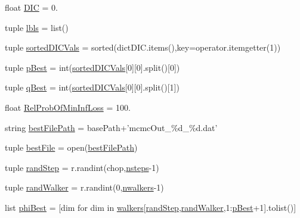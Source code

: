 \begin{DoxyCompactItemize}
\item 
float \hyperlink{namespace_final_analysis_a68c248ca9c873f73a8e36a8ee251cb55}{D\-I\-C} = 0.
\item 
tuple \hyperlink{namespace_final_analysis_ad0acefcc028d6b5ed6a5df8a33837c93}{lbls} = list()
\item 
tuple \hyperlink{namespace_final_analysis_ac46e153da6c229304def2ef1594ad6d0}{sorted\-D\-I\-C\-Vals} = sorted(dict\-D\-I\-C.\-items(),key=operator.\-itemgetter(1))
\item 
tuple \hyperlink{namespace_final_analysis_a4cb7be1a71ae9339b38be19665d4816b}{p\-Best} = int(\hyperlink{namespace_final_analysis_ac46e153da6c229304def2ef1594ad6d0}{sorted\-D\-I\-C\-Vals}\mbox{[}0\mbox{]}\mbox{[}0\mbox{]}.split()\mbox{[}0\mbox{]})
\item 
tuple \hyperlink{namespace_final_analysis_a52c1bec46dd832ef73e9e1d21d28155b}{q\-Best} = int(\hyperlink{namespace_final_analysis_ac46e153da6c229304def2ef1594ad6d0}{sorted\-D\-I\-C\-Vals}\mbox{[}0\mbox{]}\mbox{[}0\mbox{]}.split()\mbox{[}1\mbox{]})
\item 
float \hyperlink{namespace_final_analysis_a503e1ab9c53535c8cf3182b5bd683239}{Rel\-Prob\-Of\-Min\-Inf\-Loss} = 100.
\item 
string \hyperlink{namespace_final_analysis_a8286808e6828d6957c0b9b9159314b08}{best\-File\-Path} = base\-Path+'mcmc\-Out\-\_\-\%d\-\_\-\%d.\-dat'
\item 
tuple \hyperlink{namespace_final_analysis_a2990113fcd9a31e44606ce17d678f9fb}{best\-File} = open(\hyperlink{namespace_final_analysis_a8286808e6828d6957c0b9b9159314b08}{best\-File\-Path})
\item 
tuple \hyperlink{namespace_final_analysis_a02480d595c49c0f2494cb9b94dc93ad8}{rand\-Step} = r.\-randint(chop,\hyperlink{namespace_final_analysis_a11e023099f2819c75bd7ecb02c7671c3}{nsteps}-\/1)
\item 
tuple \hyperlink{namespace_final_analysis_a9dab2cf8612b12f65a094eac2c433ac1}{rand\-Walker} = r.\-randint(0,\hyperlink{namespace_final_analysis_aa7ae3a71cd02bd6488a119cf3041b24e}{nwalkers}-\/1)
\item 
list \hyperlink{namespace_final_analysis_a8d45e2b4a2cbacf49eab526ac11ecc77}{phi\-Best} = \mbox{[}dim for dim in \hyperlink{namespace_final_analysis_abcbb56dee8740482b79123ed446a959e}{walkers}\mbox{[}\hyperlink{namespace_final_analysis_a02480d595c49c0f2494cb9b94dc93ad8}{rand\-Step},\hyperlink{namespace_final_analysis_a9dab2cf8612b12f65a094eac2c433ac1}{rand\-Walker},1\-:\hyperlink{namespace_final_analysis_a4cb7be1a71ae9339b38be19665d4816b}{p\-Best}+1\mbox{]}.tolist()\mbox{]}

\end{DoxyCompactItemize}

